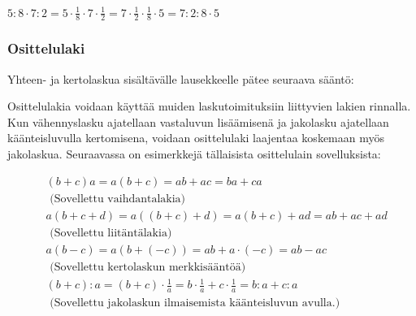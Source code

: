 \begin{esimerkki}
\end{esimerkki}


\begin{esimerkki}
$5:8\cdot 7:2=5\cdot\frac18\cdot 7\cdot\frac12=7\cdot \frac12\cdot\frac18\cdot 5=7:2:8\cdot 5$
\end{esimerkki}

\subsubsection*{Osittelulaki}

Yhteen- ja kertolaskua sisältävälle lausekkeelle pätee seuraava sääntö:


Osittelulakia voidaan käyttää muiden laskutoimituksiin liittyvien lakien rinnalla. Kun vähennyslasku ajatellaan vastaluvun lisäämisenä ja jakolasku ajatellaan käänteisluvulla kertomisena, voidaan osittelulaki laajentaa koskemaan myös jakolaskua. Seuraavassa on esimerkkejä tällaisista osittelulain sovelluksista:

\begin{esimerkki}
\begin{align*}
&(b+c)a = a(b+c) = ab+ac = ba+ca \\
&\text{ (Sovellettu vaihdantalakia)} \\
&a(b+c+d) = a((b+c)+d) = a(b+c)+ad = ab+ac+ad \\
&\text{ (Sovellettu liitäntälakia)} \\
&a(b-c) = a(b+(-c))=ab+a\cdot(-c)=ab-ac \\
&\text{ (Sovellettu kertolaskun merkkisääntöä)} \\
&(b+c):a = (b+c)\cdot\frac1a = b\cdot\frac1a+c\cdot\frac1a = b:a+c:a \\
&\text{ (Sovellettu jakolaskun ilmaisemista käänteisluvun avulla.) }
\end{align*}
\end{esimerkki}

